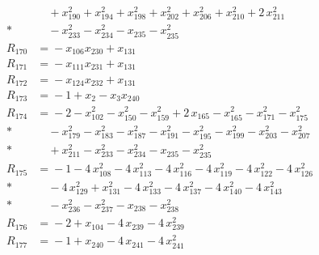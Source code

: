 \begin{align*}
&\quad{} +x_{190}^{2} +x_{194}^{2} +x_{198}^{2} +x_{202}^{2} +x_{206}^{2} +x_{210}^{2} +2\,x_{211}^{2} \\*
&\quad{} -x_{233}^{2} -x_{234}^{2} -x_{235} -x_{235}^{2} \\[2pt]
R_{170} &={} -x_{106} x_{230} +x_{131} \\[2pt]
R_{171} &={} -x_{111} x_{231} +x_{131} \\[2pt]
R_{172} &={} -x_{124} x_{232} +x_{131} \\[2pt]
R_{173} &={} -1 +x_{2} -x_{3} x_{240} \\[2pt]
R_{174} &={} -2 -x_{102}^{2} -x_{150}^{2} -x_{159}^{2} +2\,x_{165} -x_{165}^{2} -x_{171}^{2} -x_{175}^{2} \\*
&\quad{} -x_{179}^{2} -x_{183}^{2} -x_{187}^{2} -x_{191}^{2} -x_{195}^{2} -x_{199}^{2} -x_{203}^{2} -x_{207}^{2} \\*
&\quad{} +x_{211}^{2} -x_{233}^{2} -x_{234}^{2} -x_{235} -x_{235}^{2} \\[2pt]
R_{175} &={} -1 -4\,x_{108}^{2} -4\,x_{113}^{2} -4\,x_{116}^{2} -4\,x_{119}^{2} -4\,x_{122}^{2} -4\,x_{126}^{2} \\*
&\quad{} -4\,x_{129}^{2} +x_{131}^{2} -4\,x_{133}^{2} -4\,x_{137}^{2} -4\,x_{140}^{2} -4\,x_{143}^{2} \\*
&\quad{} -x_{236}^{2} -x_{237}^{2} -x_{238} -x_{238}^{2} \\[2pt]
R_{176} &={} -2 +x_{104} -4\,x_{239} -4\,x_{239}^{2} \\[2pt]
R_{177} &={} -1 +x_{240} -4\,x_{241} -4\,x_{241}^{2}
\end{align*}
\endgroup
